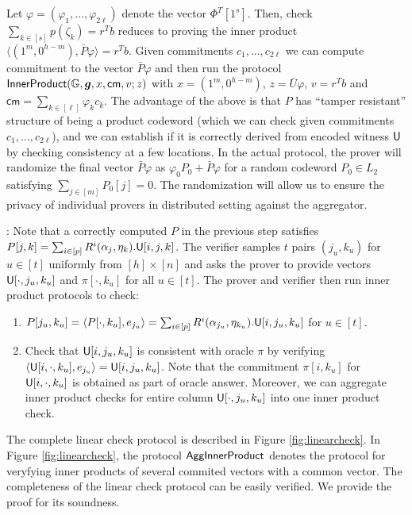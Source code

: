 Let $\varphi=(\varphi_1,\ldots,\varphi_{2\ell})$ denote the vector
$\Phi^T[1^s]$. Then, check $\sum_{k\in [s]}p(\zeta_k)=r^Tb$ reduces to
proving the inner product $\langle (1^m,0^{h-m}),\bar{P}\varphi\rangle=r^Tb$. Given
commitments $c_1,\ldots,c_{2\ell}$ we can compute commitment to the vector
$\bar{P}\varphi$ and then run the
protocol
$\mathsf{InnerProduct}(\mathbb{G},\bm{g},x, \mathsf{cm},v;z)$ with $x=(1^m, 0^{h-m})$,
$z=\bar{U}\varphi$, $v=r^Tb$ and $\mathsf{cm}=\sum_{k\in [\ell]}\varphi_kc_k$.
The
advantage of the above is that $P$ has ``tamper resistant'' structure of being a
product codeword (which we can check given commitments $c_1,\ldots,c_{2\ell}$),
and we can establish if it is correctly derived from encoded witness $\mathsf{U}$ by
checking consistency at a few locations. In the actual protocol, the prover will randomize
the final vector $\bar{P}\varphi$ as $\varphi_0P_0 + \bar{P}\varphi$ for a random codeword $P_0\in L_2$ satisfying $\sum_{j\in [m]} P_0[j]=0$. The randomization will allow us to ensure the privacy of individual provers in distributed setting against the aggregator. \smallskip

: Note that a correctly computed
$P$ in the previous step satisfies $P[j,k]=\sum_{i\in
[p]}R^i(\alpha_j,\eta_k).\mathsf{U}[i,j,k]$. The verifier samples $t$ pairs $(j_u,k_u)$ for $u\in
[t]$ uniformly from $[h]\times [n]$ and asks the prover to provide vectors
$\mathsf{U}[\cdot,j_u,k_u]$ and $\pi[\cdot,k_u]$ for all $u\in [t]$. The prover and
verifier then run inner product protocols to check:
\begin{enumerate}[{\rm (i)}]
\item $P[j_u,k_u]=\langle P[\cdot,k_u], e_{j_u}\rangle=\sum_{i\in
[p]}R^i(\alpha_{j_u},\eta_{k_u}).\mathsf{U}[i,j_u,k_u]$ for $u\in [t]$.
\item Check that $\mathsf{U}[i,j_u,k_u]$ is consistent with oracle $\pi$ by verifying
$\langle \mathsf{U}[i,\cdot,k_u],e_{j_u}\rangle=\mathsf{U}[i,j_u,k_u]$. Note that the commitment
$\pi[i,k_u]$ for $\mathsf{U}[i,\cdot,k_u]$ is obtained as part of oracle answer. Moreover, we can aggregate inner product checks for entire column $\mathsf{U}[\cdot,j_u,k_u]$
into one inner product check.
\end{enumerate}
The complete linear check protocol is described in Figure \ref{fig:linearcheck}. 
In Figure \ref{fig:linearcheck}, the protocol $\mathsf{AggInnerProduct}$ denotes the protocol 
for veryfying inner products of several commited vectors with a common vector. 
The completeness of the linear check protocol can be easily verified. We provide the proof for its
soundness.

